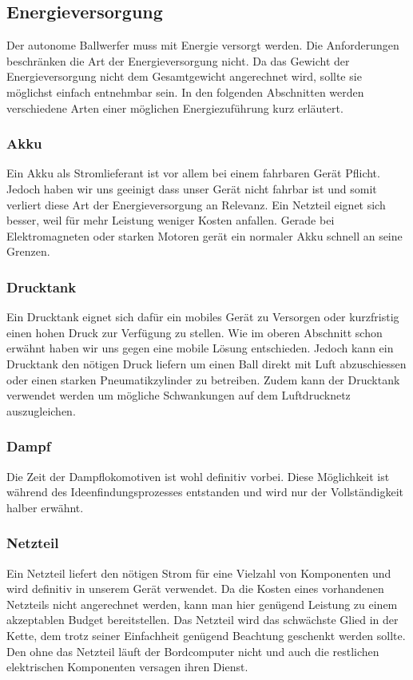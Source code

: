 \subsection{Energieversorgung}

Der autonome Ballwerfer muss mit Energie versorgt werden. Die Anforderungen beschränken die Art der Energieversorgung nicht. Da das Gewicht der Energieversorgung nicht dem Gesamtgewicht angerechnet wird, sollte sie möglichst einfach entnehmbar sein. In den folgenden Abschnitten werden verschiedene Arten einer möglichen Energiezuführung kurz erläutert.

\subsubsection{Akku}

Ein Akku als Stromlieferant ist vor allem bei einem fahrbaren Gerät Pflicht. Jedoch haben wir uns geeinigt dass unser Gerät nicht fahrbar ist und somit verliert diese Art der Energieversorgung an Relevanz. Ein Netzteil eignet sich besser, weil für mehr Leistung weniger Kosten anfallen. Gerade bei Elektromagneten oder starken Motoren gerät ein normaler Akku schnell an seine Grenzen.

\subsubsection{Drucktank}

Ein Drucktank eignet sich dafür ein mobiles Gerät zu Versorgen oder kurzfristig einen hohen Druck zur Verfügung zu stellen. Wie im oberen Abschnitt schon erwähnt haben wir uns gegen eine mobile Lösung entschieden. Jedoch kann ein Drucktank den nötigen Druck liefern um einen Ball direkt mit Luft abzuschiessen oder einen starken Pneumatikzylinder zu betreiben. Zudem kann der Drucktank verwendet werden um mögliche Schwankungen auf dem Luftdrucknetz auszugleichen.

\subsubsection{Dampf}

Die Zeit der Dampflokomotiven ist wohl definitiv vorbei. Diese Möglichkeit ist während des Ideenfindungsprozesses entstanden und wird nur der Vollständigkeit halber erwähnt.

\subsubsection{Netzteil}

Ein Netzteil liefert den nötigen Strom für eine Vielzahl von Komponenten und wird definitiv in unserem Gerät verwendet. Da die Kosten eines vorhandenen Netzteils nicht angerechnet werden, kann man hier genügend Leistung zu einem akzeptablen Budget bereitstellen. Das Netzteil wird das schwächste Glied in der Kette, dem trotz seiner Einfachheit genügend Beachtung geschenkt werden sollte. Den ohne das Netzteil läuft der Bordcomputer nicht und auch die restlichen elektrischen Komponenten versagen ihren Dienst.
